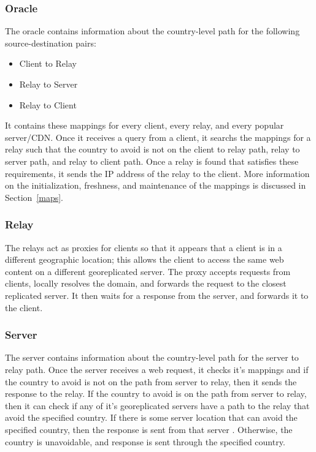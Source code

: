 \subsubsection{Oracle} The oracle contains information about the country-level path for the following source-destination pairs:

\begin{itemize}
\item Client to Relay
\item Relay to Server
\item Relay to Client
\end{itemize}

It contains these mappings for every client, every relay, and every popular server/CDN.  Once it receives a query from a client, it searchs the mappings for a relay such that the country to avoid is not on the client to relay path, relay to server path, and relay to client path.  Once a relay is found that satisfies these requirements, it sends the IP address of the relay to the client.  More information on the initialization, freshness, and maintenance of the mappings is discussed in Section~\ref{maps}.

\subsubsection{Relay} The relays act as proxies for clients so that it appears that a client is in a different geographic location; this allows the client to access the same web content on a different georeplicated server.  The proxy accepts requests from clients, locally resolves the domain, and forwards the request to the closest replicated server.  It then waits for a response from the server, and forwards it to the client.   

\subsubsection{Server} The server contains information about the country-level path for the server to relay path.  Once the server receives a web request, it checks it's mappings and if the country to avoid is not on the path from server to relay, then it sends the response to the relay.  If the country to avoid is on the path from server to relay, then it can check if any of it's georeplicated servers have a path to the relay that avoid the specified country.  If there is some server location that can avoid the specified country, then the response is sent from that server .  Otherwise, the country is unavoidable, and response is sent through the specified country.

